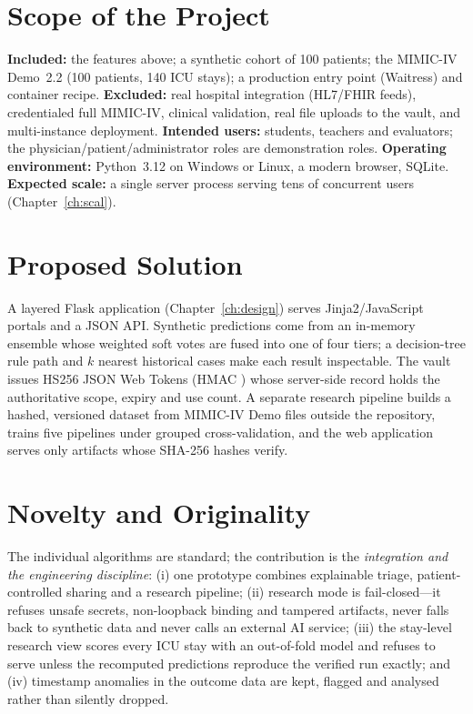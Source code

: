 \section{Scope of the Project}
\textbf{Included:} the features above; a synthetic cohort of 100 patients; the MIMIC-IV Demo~2.2
(100 patients, 140 ICU stays); a production entry point (Waitress) and container recipe.
\textbf{Excluded:} real hospital integration (HL7/FHIR feeds), credentialed full MIMIC-IV, clinical
validation, real file uploads to the vault, and multi-instance deployment.
\textbf{Intended users:} students, teachers and evaluators; the physician/patient/administrator roles are
demonstration roles. \textbf{Operating environment:} Python~3.12 on Windows or Linux, a modern browser,
SQLite. \textbf{Expected scale:} a single server process serving tens of concurrent users
(Chapter~\ref{ch:scal}).

\section{Proposed Solution}
A layered Flask application (Chapter~\ref{ch:design}) serves Jinja2/JavaScript portals and a JSON API.
Synthetic predictions come from an in-memory ensemble whose weighted soft votes are fused into one of
four tiers; a decision-tree rule path and $k$ nearest historical cases make each result inspectable.
The vault issues HS256 JSON Web Tokens \cite{rfc7519} (HMAC \cite{rfc2104}) whose server-side record
holds the authoritative scope, expiry and use count. A separate research pipeline builds a hashed,
versioned dataset from MIMIC-IV Demo files outside the repository, trains five pipelines under grouped
cross-validation, and the web application serves only artifacts whose SHA-256 hashes verify.

\section{Novelty and Originality}
The individual algorithms are standard; the contribution is the \emph{integration and the engineering
discipline}: (i) one prototype combines explainable triage, patient-controlled sharing and a research
pipeline; (ii) research mode is fail-closed---it refuses unsafe secrets, non-loopback binding and
tampered artifacts, never falls back to synthetic data and never calls an external AI service;
(iii) the stay-level research view scores every ICU stay with an out-of-fold model and refuses to serve
unless the recomputed predictions reproduce the verified run exactly; and (iv) timestamp anomalies in the
outcome data are kept, flagged and analysed rather than silently dropped.

